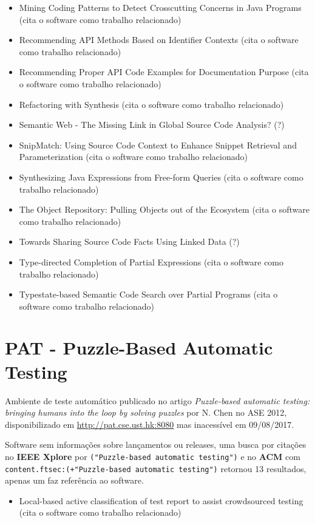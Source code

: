 \begin{itemize}
\item Mining Coding Patterns to Detect Crosscutting Concerns in Java Programs (cita o software como trabalho relacionado)
\item Recommending API Methods Based on Identifier Contexts (cita o software como trabalho relacionado)
\item Recommending Proper API Code Examples for Documentation Purpose (cita o software como trabalho relacionado)
\item Refactoring with Synthesis (cita o software como trabalho relacionado)
\item Semantic Web - The Missing Link in Global Source Code Analysis? (?)
\item SnipMatch: Using Source Code Context to Enhance Snippet Retrieval and Parameterization (cita o software como trabalho relacionado)
\item Synthesizing Java Expressions from Free-form Queries (cita o software como trabalho relacionado)
\item The Object Repository: Pulling Objects out of the Ecosystem (cita o software como trabalho relacionado)
\item Towards Sharing Source Code Facts Using Linked Data (?)
\item Type-directed Completion of Partial Expressions (cita o software como trabalho relacionado)
\item Typestate-based Semantic Code Search over Partial Programs (cita o software como trabalho relacionado)
\end{itemize}

\section{PAT - Puzzle-Based Automatic Testing}

Ambiente de teste automático
publicado no artigo {\it Puzzle-based automatic testing: bringing humans into the loop by solving puzzles}
por N. Chen
no ASE 2012,
disponibilizado em \url{http://pat.cse.ust.hk:8080}
mas inacessível em 09/08/2017.

Software sem informações sobre lançamentos ou releases,
uma busca por citações no {\bf IEEE Xplore} por
\texttt{("Puzzle-based automatic testing")}
e no {\bf ACM} com
\texttt{content.ftsec:(+"Puzzle-based automatic testing")}
retornou
13 resultados,
apenas um faz referência ao software.

\begin{itemize}
\item Local-based active classification of test report to assist crowdsourced testing (cita o software como trabalho relacionado)
\end{itemize}


